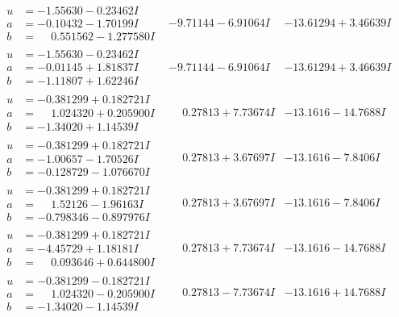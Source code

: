 \documentclass[1p]{elsarticle_modified}
\theoremstyle{definition}
\begin{document}
$$\begin{array}{c|c|c}
\begin{aligned}
u &= -1.55630 - 0.23462 I \\
a &= -0.10432 - 1.70199 I \\
b &= \phantom{-}0.551562 - 1.277580 I\end{aligned}
 & -9.71144 - 6.91064 I & -13.61294 + 3.46639 I \\ \hline\begin{aligned}
u &= -1.55630 - 0.23462 I \\
a &= -0.01145 + 1.81837 I \\
b &= -1.11807 + 1.62246 I\end{aligned}
 & -9.71144 - 6.91064 I & -13.61294 + 3.46639 I \\ \hline\begin{aligned}
u &= -0.381299 + 0.182721 I \\
a &= \phantom{-}1.024320 + 0.205900 I \\
b &= -1.34020 + 1.14539 I\end{aligned}
 & \phantom{-}0.27813 + 7.73674 I & -13.1616 - 14.7688 I \\ \hline\begin{aligned}
u &= -0.381299 + 0.182721 I \\
a &= -1.00657 - 1.70526 I \\
b &= -0.128729 - 1.076670 I\end{aligned}
 & \phantom{-}0.27813 + 3.67697 I & -13.1616 - 7.8406 I \\ \hline\begin{aligned}
u &= -0.381299 + 0.182721 I \\
a &= \phantom{-}1.52126 - 1.96163 I \\
b &= -0.798346 - 0.897976 I\end{aligned}
 & \phantom{-}0.27813 + 3.67697 I & -13.1616 - 7.8406 I \\ \hline\begin{aligned}
u &= -0.381299 + 0.182721 I \\
a &= -4.45729 + 1.18181 I \\
b &= \phantom{-}0.093646 + 0.644800 I\end{aligned}
 & \phantom{-}0.27813 + 7.73674 I & -13.1616 - 14.7688 I \\ \hline\begin{aligned}
u &= -0.381299 - 0.182721 I \\
a &= \phantom{-}1.024320 - 0.205900 I \\
b &= -1.34020 - 1.14539 I\end{aligned}
 & \phantom{-}0.27813 - 7.73674 I & -13.1616 + 14.7688 I \\ \hline\begin{aligned}

\end{aligned}
\end{array}$$
\end{document}
